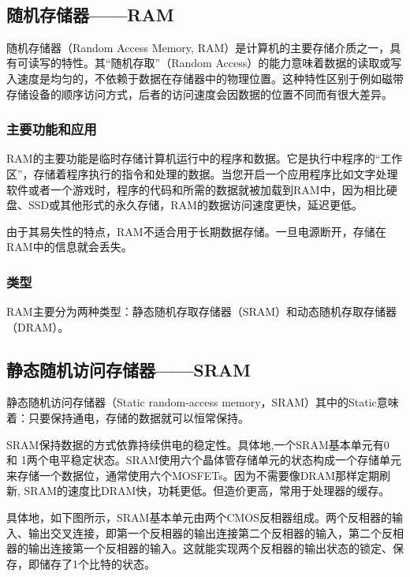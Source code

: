 
\begin{issues}
\issueDraft
\end{issues}\begin{align}
\end{align}

\subsection{随机存储器——RAM}

随机存储器（Random Access Memory, RAM）是计算机的主要存储介质之一，具有可读写的特性。其“随机存取”（Random Access）的能力意味着数据的读取或写入速度是均匀的，不依赖于数据在存储器中的物理位置。这种特性区别于例如磁带存储设备的顺序访问方式，后者的访问速度会因数据的位置不同而有很大差异。
\subsubsection{主要功能和应用}
RAM的主要功能是临时存储计算机运行中的程序和数据。它是执行中程序的“工作区”，存储着程序执行的指令和处理的数据。当您开启一个应用程序比如文字处理软件或者一个游戏时，程序的代码和所需的数据就被加载到RAM中，因为相比硬盘、SSD或其他形式的永久存储，RAM的数据访问速度更快，延迟更低。

由于其易失性的特点，RAM不适合用于长期数据存储。一旦电源断开，存储在RAM中的信息就会丢失。
\subsubsection{类型}

RAM主要分为两种类型：静态随机存取存储器（SRAM）和动态随机存取存储器（DRAM）。


\subsection{静态随机访问存储器——SRAM}

静态随机访问存储器（Static random-access memory，SRAM）其中的Static意味着：只要保持通电，存储的数据就可以恒常保持。

SRAM保持数据的方式依靠持续供电的稳定性。具体地,一个SRAM基本单元有0 和 1两个电平稳定状态。SRAM使用六个晶体管存储单元的状态构成一个存储单元来存储一个数据位，通常使用六个MOSFETs。因为不需要像DRAM那样定期刷新, SRAM的速度比DRAM快，功耗更低。但造价更高，常用于处理器的缓存。

具体地，如下图所示，SRAM基本单元由两个CMOS反相器组成。两个反相器的输入、输出交叉连接，即第一个反相器的输出连接第二个反相器的输入，第二个反相器的输出连接第一个反相器的输入。这就能实现两个反相器的输出状态的锁定、保存，即储存了1个比特的状态。

